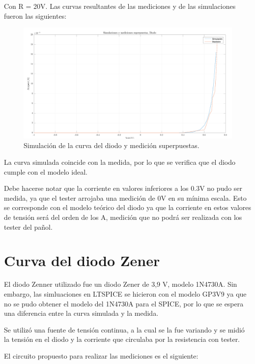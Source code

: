 \documentclass[../../e1_tp1_main.tex]{subfiles}
\begin{document}
	Con R = 20V.
	Las curvas resultantes de las mediciones y de las simulaciones fueron las siguientes:
\begin{figure}[H]	%
	\centering
	\includegraphics[scale=0.2]{imagenes/diodo_simulacion_medicion.png}
	\caption{Simulación de la curva del diodo y medición superpuestas.}
	\label{fig:ej5_diodo_simulacion_medicion}
\end{figure}

	La curva simulada coincide con la medida, por lo que se verifica que el diodo cumple con el modelo ideal.\par
	Debe hacerse notar que  la corriente en valores inferiores a los 0.3V no pudo ser medida, ya que el tester arrojaba una medición de 0V en su mínima escala. Esto se corresponde con el modelo teórico del diodo ya que la corriente en estos valores de tensión será del orden de los \micro A, medición que no podrá ser realizada con los tester del pañol.\par

\section{Curva del diodo Zener}

	El diodo Zenner utilizado fue un diodo Zener de 3,9 V, modelo 1N4730A. Sin embargo, las simluaciones en LTSPICE se hicieron con el modelo GP3V9 ya que no se pudo obtener el modelo del 1N4730A para el SPICE, por lo que se espera una diferencia entre la curva simulada y la medida.\par
	Se utilizó una fuente de tensión continua, a la cual se la fue variando y se midió la tensión en el diodo y la corriente que circulaba por la resistencia con tester.\par
	
	El circuito propuesto para realizar las mediciones es el siguiente:
	
\end{document}
